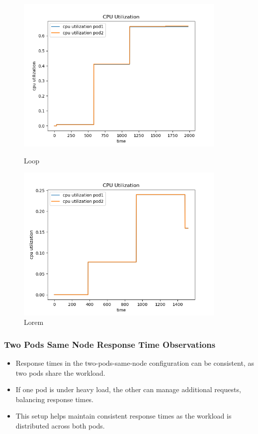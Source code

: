 \begin{figure}[h]
    \begin{minipage}[t]{0.5\textwidth}
        \centering
        \includegraphics[width=0.9\textwidth]{../sample_results/loop/two-pod-same-node/cpu-utilization-two-pod-same-node.png}
        \caption{Loop}
    \end{minipage}
    \hfill
    \begin{minipage}[t]{0.5\textwidth}
        \centering
        \includegraphics[width=0.9\textwidth]{../sample_results/lorem/two-pod-same-node/cpu-utilization-two-pod-same-node.png}
        \caption{Lorem}
    \end{minipage}
\end{figure}

\newpage
\subsubsection{Two Pods Same Node Response Time Observations}
\begin{itemize}
    \item Response times in the two-pods-same-node configuration can be consistent, as two pods share the workload.
    \item If one pod is under heavy load, the other can manage additional requests, balancing response times.
    \item This setup helps maintain consistent response times as the workload is distributed across both pods.
\end{itemize}


